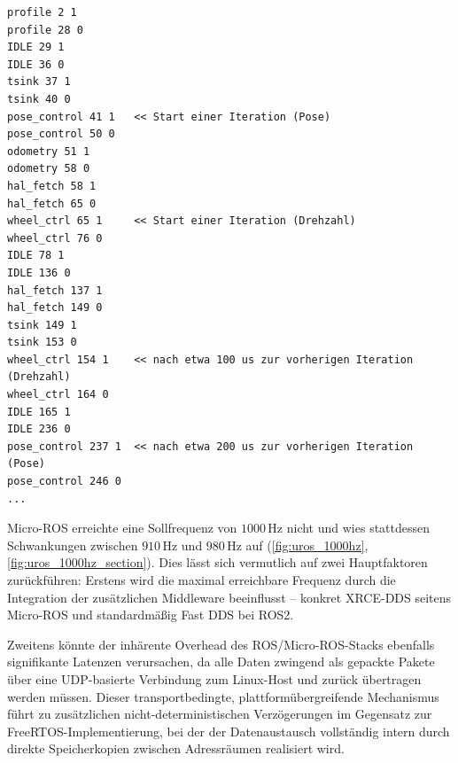 \begin{code}
\begin{verbatim}
profile 2 1
profile 28 0
IDLE 29 1
IDLE 36 0
tsink 37 1
tsink 40 0
pose_control 41 1   << Start einer Iteration (Pose)
pose_control 50 0
odometry 51 1
odometry 58 0
hal_fetch 58 1
hal_fetch 65 0
wheel_ctrl 65 1     << Start einer Iteration (Drehzahl)
wheel_ctrl 76 0
IDLE 78 1
IDLE 136 0
hal_fetch 137 1
hal_fetch 149 0
tsink 149 1
tsink 153 0
wheel_ctrl 154 1    << nach etwa 100 us zur vorherigen Iteration (Drehzahl)
wheel_ctrl 164 0
IDLE 165 1
IDLE 236 0
pose_control 237 1  << nach etwa 200 us zur vorherigen Iteration (Pose)
pose_control 246 0
...
\end{verbatim}
    \label{code:freertos_data_10000hz}
\end{code}

Micro-ROS erreichte eine Sollfrequenz von $1000\,\text{Hz}$ nicht und wies
stattdessen Schwankungen zwischen $910\,\text{Hz}$ und $980\,\text{Hz}$ auf
(\ref{fig:uros_1000hz}, \ref{fig:uros_1000hz_section}). Dies lässt sich
vermutlich auf zwei Hauptfaktoren zurückführen: Erstens wird die maximal
erreichbare Frequenz durch die Integration der zusätzlichen Middleware
beeinflusst \cite{ROS_Performance2019} -- konkret \ac{XRCE}-DDS seitens
Micro-ROS und standardmäßig Fast DDS bei ROS2.

Zweitens könnte der inhärente Overhead des ROS/Micro-ROS-Stacks ebenfalls
signifikante Latenzen verursachen, da alle Daten zwingend als gepackte Pakete
über eine UDP-basierte Verbindung zum Linux-Host und zurück übertragen werden
müssen. Dieser transportbedingte, plattformübergreifende Mechanismus führt zu
zusätzlichen nicht-deterministischen Verzögerungen im Gegensatz zur
FreeRTOS-Implementierung, bei der der Datenaustausch vollständig intern durch
direkte Speicherkopien zwischen Adressräumen realisiert wird.

